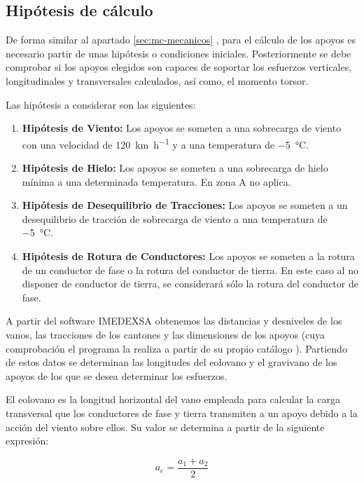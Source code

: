 \subsection{Hipótesis de cálculo}
\label{subsec:apoyos-hipotesis}
De forma similar al apartado \ref{sec:mc-mecanicos} , para el cálculo de los apoyos es necesario partir de unas hipótesis o condiciones iniciales. Posteriormente se debe comprobar si los apoyos elegidos son capaces de soportar los esfuerzos verticales, longitudinales y transversales calculados, así como, el momento torsor.

Las hipótesis a considerar son las siguientes:
\begin{enumerate}
\item\textbf{Hipótesis de Viento:} Los apoyos se someten a una sobrecarga de viento con una velocidad de \SI{120}{\kilo\meter\per\hour} y a una temperatura de \SI{-5}{\celsius}.
\item\textbf{Hipótesis de Hielo:} Los apoyos se someten a una sobrecarga de hielo mínima a una determinada temperatura. En zona A no aplica.
\item\textbf{Hipótesis de Desequilibrio de Tracciones:} Los apoyos se someten a un desequilibrio de tracción de sobrecarga de viento a  una temperatura de \SI{-5}{\celsius}.
\item\textbf{Hipótesis de Rotura de Conductores:} Los apoyos se someten a la rotura de un conductor de fase o la rotura del conductor de tierra. En este caso al no disponer de conductor de tierra, se considerará sólo la rotura del conductor de fase.
\end{enumerate}

A partir del software IMEDEXSA obtenemos las distancias y desniveles de los vanos, las tracciones de los cantones y las dimensiones de los apoyos (cuya comprobación el programa la realiza a partir de su propio catálogo \cite{IMEDEXSA_Catalogo_2019}). Partiendo de estos datos se determinan las longitudes del eolovano y el gravivano de los apoyos de los que se desea determinar los esfuerzos. 

El eolovano es la longitud horizontal del vano empleada para calcular la carga transversal que los conductores de fase y tierra transmiten a un apoyo debido a la acción del viento sobre ellos. Su valor se determina a partir de la siguiente expresión:

\begin{equation}
    a_e=\frac{a_1+a_2}{2}
    \label{eq:eolovano}
\end{equation}

